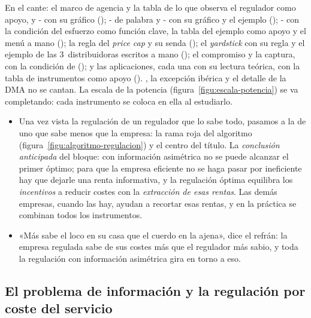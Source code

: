\documentclass[11pt]{article}
\begin{document}
\begin{notaopositor}
En el cante: el marco de agencia y la tabla de lo que observa el regulador como apoyo, y - con su gráfico (); - de palabra y - con su gráfico y el ejemplo (); - con la condición del esfuerzo como función clave, la tabla del ejemplo como apoyo y el menú a mano (); la regla del \emph{price cap} y su senda (); el \emph{yardstick} con su regla y el ejemplo de las 3~distribuidoras escritos a mano (); el compromiso y la captura, con la condición de  (); y las aplicaciones, cada una con su lectura teórica, con la tabla de instrumentos como apoyo (). , la excepción ibérica y el detalle de la DMA no se cantan. La escala de la potencia (figura~\ref{figu:escala-potencia}) se va completando: cada instrumento se coloca en ella al estudiarlo.
\end{notaopositor}

\begin{itemize}
\item Una vez vista la regulación de un regulador que lo sabe todo, pasamos a la de uno que sabe menos que la empresa: la rama roja del algoritmo (figura~\ref{figu:algoritmo-regulacion}) y el centro del título. La \emph{conclusión anticipada} del bloque: con información asimétrica no se puede alcanzar el primer óptimo; para que la empresa eficiente no se haga pasar por ineficiente hay que dejarle una renta informativa, y la regulación óptima equilibra los \emph{incentivos} a reducir costes con la \emph{extracción de esas rentas}. Las demás empresas, cuando las hay, ayudan a recortar esas rentas, y en la práctica se combinan todos los instrumentos.
\item «Más sabe el loco en su casa que el cuerdo en la ajena», dice el refrán: la empresa regulada sabe de sus costes más que el regulador más sabio, y toda la regulación con información asimétrica gira en torno a eso.
\end{itemize}

\subsection{El problema de información y la regulación por coste del servicio}\label{sec:coste-servicio}
\end{document}
